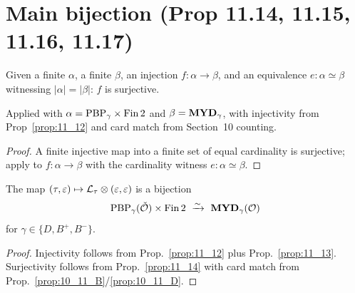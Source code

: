 \section{Main bijection (Prop 11.14, 11.15, 11.16, 11.17)}

\begin{proposition}
  \label{prop:11_14}
  \leanok
  Given a finite $\alpha$, a finite $\beta$, an injection $f : \alpha \to \beta$, and an equivalence $e : \alpha \simeq \beta$ witnessing $|\alpha| = |\beta|$:
  $f$ is surjective.

  Applied with $\alpha = \mathrm{PBP}_\gamma \times \mathrm{Fin}\,2$ and $\beta = \mathbf{MYD}_\gamma$, with injectivity from Prop~\ref{prop:11_12} and card match from Section~10 counting.
\end{proposition}
\begin{proof}
  \leanok
  A finite injective map into a finite set of equal cardinality is surjective; apply to $f : \alpha \to \beta$ with the cardinality witness $e : \alpha \simeq \beta$.
\end{proof}


\begin{proposition}
  \label{prop:11_15}
  \leanok
  The map $(\tau, \varepsilon) \mapsto \mathcal{L}_\tau \otimes (\varepsilon, \varepsilon)$ is a bijection
  \[ \mathrm{PBP}_\gamma(\check{\mathcal{O}}) \times \mathrm{Fin}\,2 \ \xrightarrow{\sim}\ \mathbf{MYD}_\gamma(\mathcal{O}) \]
  for $\gamma \in \{D, B^+, B^-\}$.
\end{proposition}
\begin{proof}
  \leanok
  Injectivity follows from Prop.~\ref{prop:11_12} plus Prop.~\ref{prop:11_13}. Surjectivity follows from Prop.~\ref{prop:11_14} with card match from Prop.~\ref{prop:10_11_B}/\ref{prop:10_11_D}.
\end{proof}


